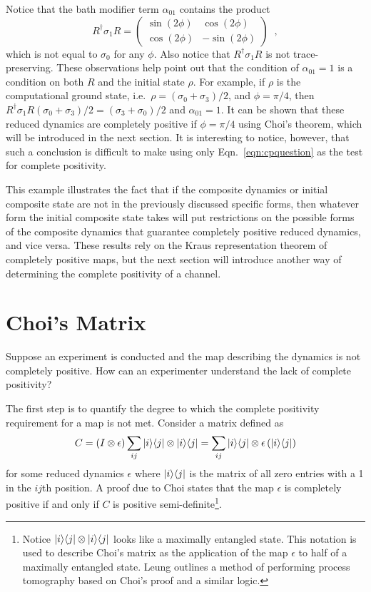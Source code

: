 \begin{example}
Notice that the bath modifier term $\alpha_{01}$ contains the product
$$
R^\dagger\sigma_1R = \begin{pmatrix}
\sin{\left(2\phi\right)}&\cos{\left(2\phi\right)}\\
\cos{\left(2\phi\right)}&-\sin{\left(2\phi\right)}
\end{pmatrix}\;\;,
$$
which is not equal to $\sigma_0$ for any $\phi$.  Also notice that $R^\dagger\sigma_1R$ is not trace-preserving.  These observations help point out that the condition of $\alpha_{01} = 1$ is a condition on both $R$ and the initial state $\rho$.  For example, if $\rho$ is the computational ground state, i.e.\ $\rho = (\sigma_0+\sigma_3)/2$, and $\phi=\pi/4$, then $R^\dagger\sigma_1R(\sigma_0+\sigma_3)/2 = (\sigma_3+\sigma_0)/2$ and $\alpha_{01}=1$.  It can be shown that these reduced dynamics are completely positive if $\phi=\pi/4$ using Choi's theorem, which will be introduced in the next section.  It is interesting to notice, however, that such a conclusion is difficult to make using only Eqn.\ \ref{eqn:cpquestion} as the test for complete positivity.
\end{example}

This example illustrates the fact that if the composite dynamics or initial composite state are not in the previously discussed specific forms, then whatever form the initial composite state takes will put restrictions on the possible forms of the composite dynamics that guarantee completely positive reduced dynamics, and vice versa.  These results rely on the Kraus representation theorem of completely positive maps, but the next section will introduce another way of determining the complete positivity of a channel.

\section{Choi's Matrix}
\label{sec:choi}

Suppose an experiment is conducted and the map describing the dynamics is not completely positive.  How can an experimenter understand the lack of complete positivity?

The first step is to quantify the degree to which the complete positivity requirement for a map is not met.  Consider a matrix defined as
$$
C = \left(I \otimes \epsilon\right)\sum_{ij} |i\rangle\langle j| \otimes |i\rangle\langle j| = \sum_{ij} |i\rangle\langle j| \otimes \epsilon\left( |i\rangle\langle j| \right)
$$
for some reduced dynamics $\epsilon$ where $|i\rangle\langle j|$ is the matrix of all zero entries with a 1 in the $ij$th position.  A proof due to Choi \cite{Choi1975} states that the map $\epsilon$ is completely positive if and only if $C$ is positive semi-definite\footnote{Notice $|i\rangle\langle j|\otimes |i\rangle\langle j|$ looks like a maximally entangled state.  This notation is used to describe Choi's matrix as the application of the map $\epsilon$ to half of a maximally entangled state.  Leung \cite{Leung2003} outlines a method of performing process tomography based on Choi's proof and a similar logic.}.  


